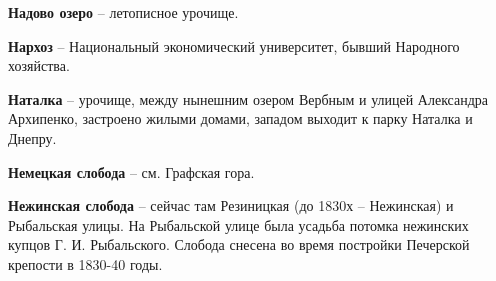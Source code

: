 \medskip










\textbf{Надово озеро} – летописное урочище.\\

\medskip


\textbf{Нархоз} – Национальный экономический университет, бывший Народного хозяйства.\\


\medskip


\textbf{Наталка} – урочище, между нынешним озером Вербным и улицей Александра Архипенко, застроено жилыми домами, западом выходит к парку Наталка и Днепру.\\
\medskip

\textbf{Немецкая слобода} – см. Графская гора.\\


\medskip


\textbf{Нежинская слобода} – сейчас там Резиницкая (до 1830х – Нежинская) и Рыбальская улицы. На Рыбальской улице была усадьба потомка нежинских купцов Г. И. Рыбальского. Слобода снесена во время постройки Печерской крепости в 1830-40 годы.\\ 

